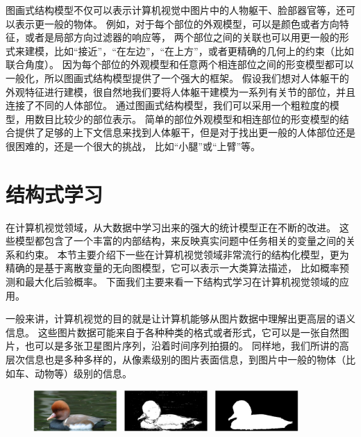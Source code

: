 图画式结构模型不仅可以表示计算机视觉中图片中的人物躯干、脸部器官等，还可以表示更一般的物体。
例如，对于每个部位的外观模型，可以是颜色或者方向特征，或者是局部方向过滤器的响应等，
两个部位之间的关联也可以用更一般的形式来建模，比如“接近”，“在左边”，“在上方”，或者更精确的几何上的约束（比如联合角度）。
因为每个部位的外观模型和任意两个相连部位之间的形变模型都可以一般化，所以图画式结构模型提供了一个强大的框架。
假设我们想对人体躯干的外观特征进行建模，很自然地我们要将人体躯干建模为一系列有关节的部位，并且连接了不同的人体部位。
通过图画式结构模型，我们可以采用一个粗粒度的模型，用数目比较少的部位表示。
简单的部位外观模型和相连部位的形变模型的结合提供了足够的上下文信息来找到人体躯干，但是对于找出更一般的人体部位还是很困难的，还是一个很大的挑战，
比如“小腿”或“上臂”等。

\section{结构式学习}
在计算机视觉领域，从大数据中学习出来的强大的统计模型正在不断的改进。
这些模型都包含了一个丰富的内部结构，来反映真实问题中任务相关的变量之间的关系和约束。
本节主要介绍下一些在计算机视觉领域非常流行的结构化模型，更为精确的是基于离散变量的无向图模型，它可以表示一大类算法描述，
比如概率预测和最大化后验概率。
下面我们主要来看一下结构式学习在计算机视觉领域的应用。


一般来讲，计算机视觉的目的就是让计算机能够从图片数据中理解出更高层的语义信息。
这些图片数据可能来自于各种种类的格式或者形式，它可以是一张自然图片，也可以是多张卫星图片序列，沿着时间序列拍摄的。
同样地，我们所讲的高层次信息也是多种多样的，从像素级别的图片表面信息，到图片中一般的物体（比如车、动物等）级别的信息。

\begin{figure}
\centering
\includegraphics[width=0.9\textwidth]{img/struct.jpg}
\label{fig:struct}
\end{figure}

